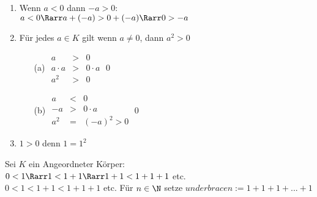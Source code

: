 	\begin{enumerate}
	\item{Wenn $a < 0$ dann $-a > 0$:\\
	$a < 0 \Rarr a + (-a) > 0 + (-a) \Rarr 0 > -a$}
	\item{Für jedes $a \in K $ gilt wenn $a \neq 0$, dann $a^2 > 0$\\
	\begin{itemize}
	\item[(a)]{$\begin{array}{ccc}
	a &>& 0\\
	a · a &>& 0 · a\\
	a^2 &>& 0
	\end{array}$\qed}
	\item[(b)]{$\begin{array}{ccc}
		a &<& 0\\
		-a &>& 0 · a\\
		a^2 &=& (-a)^2 > 0
		\end{array}$\qed}
	\end{itemize}}
	\item{$1 > 0 $ denn $1 = 1^2$}
	\end{enumerate}
	Sei $K$ ein Angeordneter Körper:\\
	$0 < 1 \Rarr 1 < 1 + 1 \Rarr 1 + 1 < 1 + 1 + 1 $ etc.\\
	$0 < 1 < 1 + 1 < 1 + 1 +1 $ etc.
	Für $n \in \N$ setze $underbrace{n:= 1 + 1 + 1 + ... + 1}$
	
